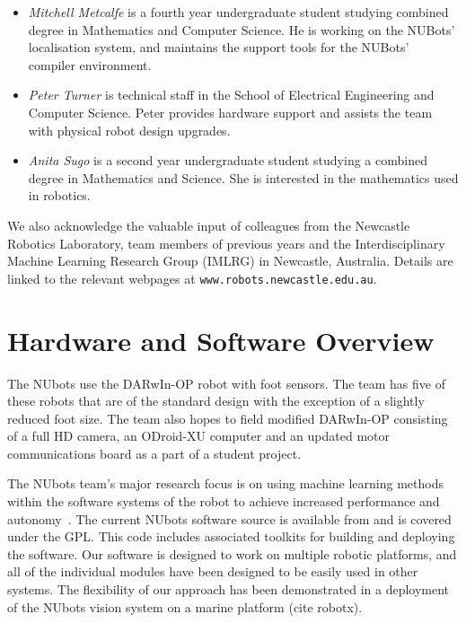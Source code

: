\documentclass{llncs}
\begin{document}
\begin{itemize}
\item \emph{Mitchell Metcalfe} is a fourth year undergraduate student studying combined degree in Mathematics and Computer Science. He is working on the NUBots' localisation system, and maintains the support tools for the NUBots' compiler environment.

\item \emph{Peter Turner} is technical staff in the School of Electrical Engineering and Computer Science. Peter provides hardware support and assists the team with physical robot design upgrades. %

\item \emph{Anita Sugo} is a second year undergraduate student studying a combined degree in Mathematics and Science. She is interested in the mathematics used in robotics.

\end{itemize}

We also acknowledge the valuable input of colleagues from the Newcastle Robotics Laboratory, team members of previous years
and the Interdisciplinary Machine Learning Research Group (IMLRG) in
Newcastle, Australia. Details are linked to the relevant webpages at
\texttt{www.robots.newcastle.edu.au}.


\section{Hardware and Software Overview}
The NUbots use the DARwIn-OP robot with foot sensors. The team has five of these robots that are of the standard design with the exception of a slightly reduced foot size. The team also hopes to field modified DARwIn-OP consisting of a full HD camera, an ODroid-XU computer and an updated motor communications board as a part of a student project. %


The NUbots team's major research focus is on using machine learning methods within the software systems of the robot to achieve increased performance and autonomy~\cite{ChalupEtAlSMC2007}. The current NUbots software source is available from \cite{nubotsGit} and is covered under the GPL. This code includes associated toolkits for building and deploying the software. Our software is designed to work on multiple robotic platforms, and all of the individual modules have been designed to be easily used in other systems. The flexibility of our approach has been demonstrated in a deployment of the NUbots vision system on a marine platform (cite robotx). %
\end{document}
